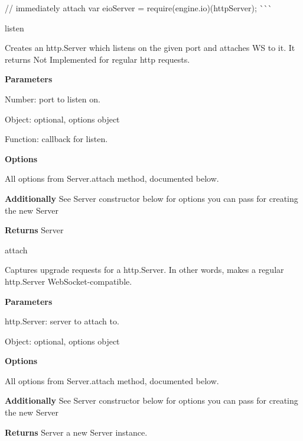 \begin{DoxyItemize}
// immediately attach var eio\+Server = require(\textquotesingle{}engine.\+io\textquotesingle{})(http\+Server); \`{}\`{}\`{}
\item {\ttfamily listen}
\begin{DoxyItemize}
\item Creates an {\ttfamily http.\+Server} which listens on the given port and attaches WS to it. It returns { Not Implemented} for regular http requests.
\item {\bfseries Parameters}
\begin{DoxyItemize}
\item {\ttfamily Number}\+: port to listen on.
\item {\ttfamily Object}\+: optional, options object
\item {\ttfamily Function}\+: callback for {\ttfamily listen}.
\end{DoxyItemize}
\item {\bfseries Options}
\begin{DoxyItemize}
\item All options from {\ttfamily Server.\+attach} method, documented below.
\item {\bfseries Additionally} See Server {\ttfamily constructor} below for options you can pass for creating the new Server
\end{DoxyItemize}
\item {\bfseries Returns} {\ttfamily Server}
\end{DoxyItemize}
\item {\ttfamily attach}
\begin{DoxyItemize}
\item Captures {\ttfamily upgrade} requests for a {\ttfamily http.\+Server}. In other words, makes a regular http.\+Server Web\+Socket-\/compatible.
\item {\bfseries Parameters}
\begin{DoxyItemize}
\item {\ttfamily http.\+Server}\+: server to attach to.
\item {\ttfamily Object}\+: optional, options object
\end{DoxyItemize}
\item {\bfseries Options}
\begin{DoxyItemize}
\item All options from {\ttfamily Server.\+attach} method, documented below.
\item {\bfseries Additionally} See Server {\ttfamily constructor} below for options you can pass for creating the new Server
\end{DoxyItemize}
\item {\bfseries Returns} {\ttfamily Server} a new Server instance.
\end{DoxyItemize}
\end{DoxyItemize}



